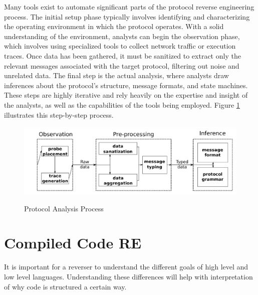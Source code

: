 Many tools exist to automate significant parts of the protocol reverse engineering process. The initial setup phase typically involves identifying and characterizing the operating environment in which the protocol operates. With a solid understanding of the environment, analysts can begin the observation phase, which involves using specialized tools to collect network traffic or execution traces. Once data has been gathered, it must be sanitized to extract only the relevant messages associated with the target protocol, filtering out noise and unrelated data. The final step is the actual analysis, where analysts draw inferences about the protocol’s structure, message formats, and state machines. These steps are highly iterative and rely heavily on the expertise and insight of the analysts, as well as the capabilities of the tools being employed. Figure \ref{fig:protocolanalysis} illustrates this step-by-step process.
\begin{figure}[H]
	\caption{Protocol Analysis Process}
	\includegraphics[width=\linewidth]{protocol_analysis_process.png}
    \label{fig:protocolanalysis}
\end{figure}
\section{Compiled Code RE}
It is important for a reverser to understand the different goals of high level and low level languages. 
Understanding these differences will help with interpretation of why code is structured a certain way.

